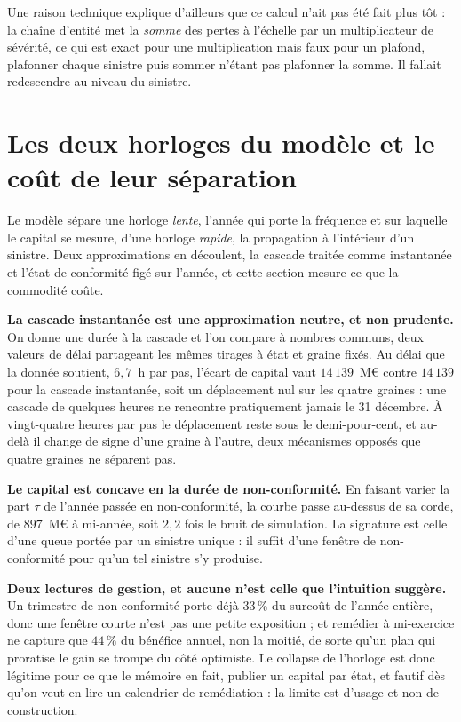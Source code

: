 Une raison technique explique d'ailleurs que ce calcul n'ait pas été fait plus tôt : la chaîne
d'entité met la \emph{somme} des pertes à l'échelle par un multiplicateur de sévérité, ce qui est
exact pour une multiplication mais faux pour un plafond, plafonner chaque sinistre puis
sommer n'étant pas plafonner la somme. Il fallait redescendre au niveau du sinistre.

\section{Les deux horloges du modèle et le coût de leur séparation}
\label{sec:ann-horloges}

Le modèle sépare une horloge \emph{lente}, l'année qui porte la fréquence et sur laquelle le
capital se mesure, d'une horloge \emph{rapide}, la propagation à l'intérieur d'un sinistre. Deux
approximations en découlent, la cascade traitée comme instantanée et l'état de conformité figé sur
l'année, et cette section mesure ce que la commodité coûte.

\textbf{La cascade instantanée est une approximation neutre, et non prudente.} On donne une durée à
la cascade et l'on compare à nombres communs, deux valeurs de délai partageant les mêmes tirages à
état et graine fixés. Au délai que la donnée soutient, $6{,}7$~h par pas, l'écart de capital vaut
$14\,139$~M\euro{} contre $14\,139$ pour la cascade instantanée, soit un déplacement nul sur les
quatre graines : une cascade de quelques heures ne rencontre pratiquement jamais le 31 décembre. À
vingt-quatre heures par pas le déplacement reste sous le demi-pour-cent, et au-delà il change de
signe d'une graine à l'autre, deux mécanismes opposés que quatre graines ne séparent pas.

\textbf{Le capital est concave en la durée de non-conformité.} En faisant varier la part $\tau$ de
l'année passée en non-conformité, la courbe passe au-dessus de sa corde, de $897$~M\euro{} à
mi-année, soit $2{,}2$ fois le bruit de simulation. La signature est celle d'une queue portée par
un sinistre unique : il suffit d'une fenêtre de non-conformité pour qu'un tel sinistre s'y
produise.

\begin{cle}
\textbf{Deux lectures de gestion, et aucune n'est celle que l'intuition suggère.} Un trimestre de
non-conformité porte déjà $33\,\%$ du surcoût de l'année entière, donc une fenêtre courte n'est pas
une petite exposition ; et remédier à mi-exercice ne capture que $44\,\%$ du bénéfice annuel, non
la moitié, de sorte qu'un plan qui proratise le gain se trompe du côté optimiste. Le collapse de
l'horloge est donc légitime pour ce que le mémoire en fait, publier un capital par état, et fautif
dès qu'on veut en lire un calendrier de remédiation : la limite est d'usage et non de construction.
\end{cle}

